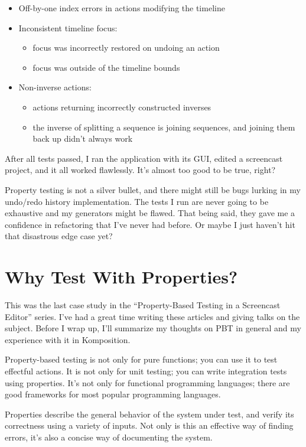 \begin{itemize}
\item Off-by-one index errors in actions modifying the timeline
\item Inconsistent timeline focus:
    \begin{itemize}
    \item focus was incorrectly restored on undoing an action
    \item focus was outside of the timeline bounds
    \end{itemize}
\item Non-inverse actions:
    \begin{itemize}
    \item actions returning incorrectly constructed inverses
    \item the inverse of splitting a sequence is joining sequences, and joining them back up didn't always work
    \end{itemize}
\end{itemize}
After all tests passed, I ran the application with its GUI, edited a screencast project, and it all worked flawlessly. It's almost too good to be true, right?

Property testing is not a silver bullet, and there might still be bugs lurking in my undo/redo history implementation. The tests I run are never going to be exhaustive and my generators might be flawed. That being said, they gave me a confidence in refactoring that I've never had before. Or maybe I just haven't hit that disastrous edge case yet?

\section{Why Test With Properties?}
This was the last case study in the ``Property-Based Testing in a Screencast Editor'' series. I've had a great time writing these articles and giving talks on the subject. Before I wrap up, I'll summarize my thoughts on PBT in general and my experience with it in Komposition.

Property-based testing is not only for pure functions; you can use it to test effectful actions. It is not only for unit testing; you can write integration tests using properties. It's not only for functional programming languages; there are good frameworks for most popular programming languages.

Properties describe the general behavior of the system under test, and verify its correctness using a variety of inputs. Not only is this an effective way of finding errors, it's also a concise way of documenting the system.

